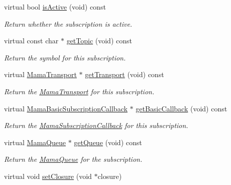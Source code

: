 \begin{DoxyCompactItemize}
virtual bool \hyperlink{classWombat_1_1MamaBasicSubscription_ad651a6cd62c02a074ad276dbb11ddd4b}{isActive} (void) const 
\begin{DoxyCompactList}\small\item\em Return whether the subscription is active. \item\end{DoxyCompactList}\item 
virtual const char $\ast$ \hyperlink{classWombat_1_1MamaBasicSubscription_acc13b00868fd554476794e43dafa67e9}{getTopic} (void) const 
\begin{DoxyCompactList}\small\item\em Return the symbol for this subscription. \item\end{DoxyCompactList}\item 
virtual \hyperlink{classWombat_1_1MamaTransport}{MamaTransport} $\ast$ \hyperlink{classWombat_1_1MamaBasicSubscription_aa2f74c1cb97f84f059a880ddd28ef929}{getTransport} (void) const 
\begin{DoxyCompactList}\small\item\em Return the {\ttfamily \hyperlink{classWombat_1_1MamaTransport}{MamaTransport}} for this subscription. \item\end{DoxyCompactList}\item 
virtual \hyperlink{classWombat_1_1MamaBasicSubscriptionCallback}{MamaBasicSubscriptionCallback} $\ast$ \hyperlink{classWombat_1_1MamaBasicSubscription_a1b58d2258ea0d4c09f53737abac4e6ce}{getBasicCallback} (void) const 
\begin{DoxyCompactList}\small\item\em Return the {\ttfamily \hyperlink{classWombat_1_1MamaSubscriptionCallback}{MamaSubscriptionCallback}} for this subscription. \item\end{DoxyCompactList}\item 
virtual \hyperlink{classWombat_1_1MamaQueue}{MamaQueue} $\ast$ \hyperlink{classWombat_1_1MamaBasicSubscription_ad942460e43402f4e97f8d18086eb61c7}{getQueue} (void) const 
\begin{DoxyCompactList}\small\item\em Return the {\ttfamily \hyperlink{classWombat_1_1MamaQueue}{MamaQueue}} for the subscription. \item\end{DoxyCompactList}\item 
virtual void \hyperlink{classWombat_1_1MamaBasicSubscription_afd46faca33c0b3198e75d906dc79f848}{setClosure} (void $\ast$closure)

\end{DoxyCompactItemize}
